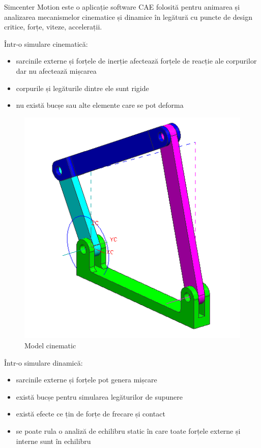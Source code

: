 Simcenter Motion este o aplicație software CAE folosită pentru animarea și analizarea mecanismelor cinematice și dinamice în 
legătură cu puncte de design critice, forțe, viteze, accelerații. \cite{cae2}\newline

Într-o simulare cinematică:
\begin{itemize}
    \item sarcinile externe și forțele de inerție afectează forțele de reacție ale corpurilor dar nu afectează mișcarea
    \item corpurile și legăturile dintre ele sunt rigide
    \item nu există bucșe sau alte elemente care se pot deforma
\end{itemize}

\begin{figure}[H]
    \begin{center}
        \includegraphics[scale=0.7]{imagini/simcenter/cinematica.png}
        \caption{Model cinematic \protect\footnotemark}
        \label{fig:cinematic}
    \end{center}    
\end{figure}


\newpage

Într-o simulare dinamică:
\begin{itemize}
    \item sarcinile externe și forțele pot genera mișcare
    \item există bucșe pentru simularea legăturilor de supunere
    \item există efecte ce țin de forțe de frecare și contact 
    \item se poate rula o analiză de echilibru static în care toate forțele externe și interne sunt în echilibru
\end{itemize}

